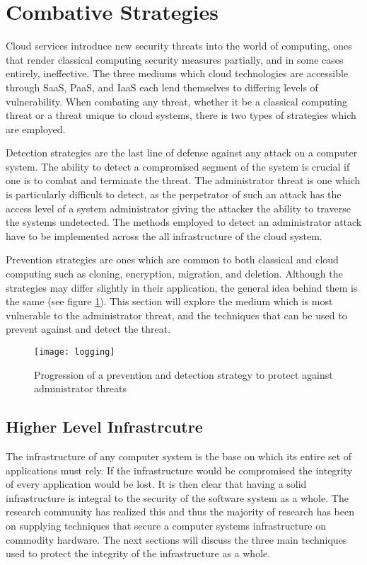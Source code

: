 \section{Combative Strategies}
\label{overview}

Cloud services introduce new security threats into the world of computing, ones that render classical computing security measures partially, and in some cases entirely, ineffective. The three mediums which cloud technologies are accessible through SaaS, PaaS, and IaaS each lend themselves to differing levels of vulnerability.\cite{theoharidou}\cite{subashini} When combating any threat, whether it be a classical computing threat or a threat unique to cloud systems, there is two types of strategies which are employed.

Detection strategies are the last line of defense against any attack on a computer system. The ability to detect a compromised segment of the system is crucial if one is to combat and terminate the threat. The administrator threat is one which is particularly difficult to detect, as the perpetrator of such an attack has the access level of a system administrator giving the attacker the ability to traverse the systems undetected. The methods employed to detect an administrator attack have to be implemented across the all infrastructure of the cloud system.\cite{dawoud}

Prevention strategies are ones which are common to both classical and cloud computing such as cloning, encryption, migration, and deletion. Although the strategies may differ slightly in their application, the general idea behind them is the same (see figure \ref{prevention_detection_image}).
This section will explore the medium which is most vulnerable to the administrator threat, and the techniques that can be used to prevent against and detect the threat.

\begin{figure}
  \centering
    \texttt{[image: logging]}
  \caption{Progression of a prevention and detection strategy to protect against administrator threats}
  \label{prevention_detection_image}
\end{figure}

\subsection{Higher Level Infrastrcutre}
\label{hlInfrastructure}

The infrastructure of any computer system is the base on which its entire set of applications must rely. If the infrastructure would be compromised the integrity of every application would be lost. \cite{dawoud} It is then clear that having a solid infrastructure is integral to the security of the software system as a whole. The research community has realized this and thus the majority of research has been on supplying techniques that secure a computer systems infrastructure on commodity hardware. The next sections will discuss the three main techniques used to protect the integrity of the infrastructure as a whole.

